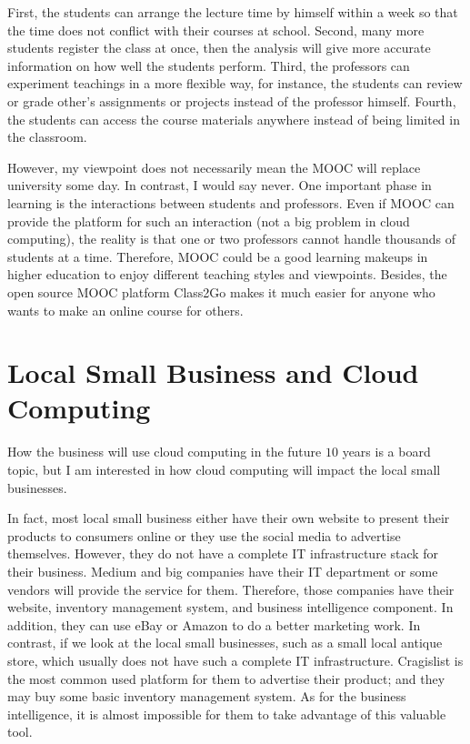 First, the students can arrange the lecture time by himself within a week so that the time does not conflict with their courses at school. Second, many more students register the class at once, then the analysis will give more accurate information on how well the students perform. Third, the professors can experiment teachings in a more flexible way, for instance, the students can review or grade other's assignments or projects instead of the professor himself. Fourth, the students can access the course materials anywhere instead of being limited in the classroom.

However, my viewpoint does not necessarily mean the MOOC will replace university some day. In contrast, I would say never. One important phase in learning is the interactions between students and professors. Even if MOOC can provide the platform for such an interaction (not a big problem in cloud computing), the reality is that one or two professors cannot handle thousands of students at a time. Therefore, MOOC could be a good learning makeups in higher education to enjoy different teaching styles and viewpoints. Besides, the open source MOOC platform Class2Go\cite{class2go} makes it much easier for anyone who wants to make an online course for others.

\section{Local Small Business and Cloud Computing}
How the business will use cloud computing in the future $10$ years is a board topic, but I am interested in how cloud computing will impact the local small businesses. 

In fact, most local small business either have their own website to present their products to consumers online or they use the social media to advertise themselves. However, they do not have a complete IT infrastructure stack for their business. Medium and big companies have their IT department or some vendors will provide the service for them. Therefore, those companies have their website, inventory management system, and business intelligence component. In addition, they can use eBay or Amazon to do a better marketing work. In contrast, if we look at the local small businesses, such as a small local antique store, which usually does not have such a complete IT infrastructure. Cragislist is the most common used platform for them to advertise their product; and they may buy some basic inventory management system. As for the business intelligence, it is almost impossible for them to take advantage of this valuable tool.


